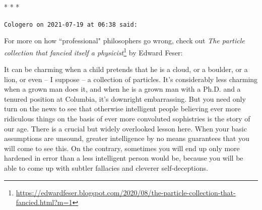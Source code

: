 
\begin{center}* * *\end{center}

\begin{footnotesize}\begin{sffamily}



\texttt{Cologero on 2021-07-19 at 06:38 said: }

For more on how ``professional" philosophers go wrong, check out \textit{The particle collection that fancied itself a physicist}\footnote{\url{https://edwardfeser.blogspot.com/2020/08/the-particle-collection-that-fancied.html?m=1}} by Edward Feser:

\begin{quotex}
It can be charming when a child pretends that he is a cloud, or a boulder, or a lion, or even – I suppose – a collection of particles. It's considerably less charming when a grown man does it, and when he is a grown man with a Ph.D. and a tenured position at Columbia, it's downright embarrassing. But you need only turn on the news to see that otherwise intelligent people believing ever more ridiculous things on the basis of ever more convoluted sophistries is the story of our age. There is a crucial but widely overlooked lesson here. When your basic assumptions are unsound, greater intelligence by no means guarantees that you will come to see this. On the contrary, sometimes you will end up only more hardened in error than a less intelligent person would be, because you will be able to come up with subtler fallacies and cleverer self-deceptions. 

\end{quotex}

\end{sffamily}\end{footnotesize}
